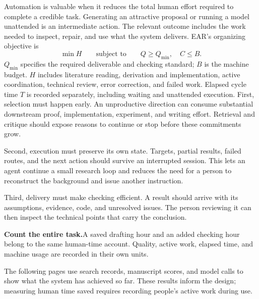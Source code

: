 Automation is valuable when it reduces the total human effort required to complete a credible task. Generating an attractive proposal or running a model unattended is an intermediate action. The relevant outcome includes the work needed to inspect, repair, and use what the system delivers. EAR's organizing objective is
\[
\min H\qquad\text{subject to}\qquad Q\ge Q_{\min},\quad C\le B.
\]
$Q_{\min}$ specifies the required deliverable and checking standard; $B$ is the machine budget. $H$ includes literature reading, derivation and implementation, active coordination, technical review, error correction, and failed work. Elapsed cycle time $T$ is recorded separately, including waiting and unattended execution.
First, selection must happen early. An unproductive direction can consume substantial downstream proof, implementation, experiment, and writing effort. Retrieval and critique should expose reasons to continue or stop before these commitments grow.

Second, execution must preserve its own state. Targets, partial results, failed routes, and the next action should survive an interrupted session. This lets an agent continue a small research loop and reduces the need for a person to reconstruct the background and issue another instruction.

Third, delivery must make checking efficient. A result should arrive with its assumptions, evidence, code, and unresolved issues. The person reviewing it can then inspect the technical points that carry the conclusion.
\begin{insight}
\textbf{Count the entire task.}\quad A saved drafting hour and an added checking hour belong to the same human-time account. Quality, active work, elapsed time, and machine usage are recorded in their own units.
\end{insight}
The following pages use search records, manuscript scores, and model calls to show what the system has achieved so far. These results inform the design; measuring human time saved requires recording people's active work during use.

